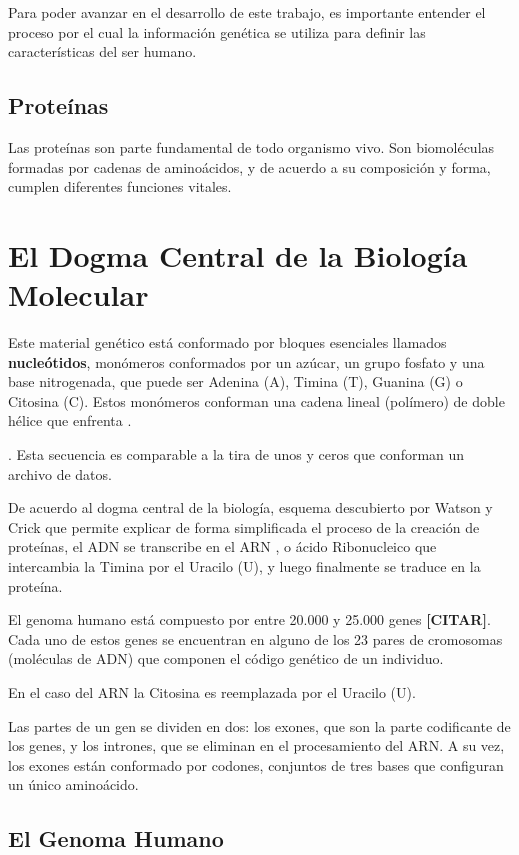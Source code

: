 Para poder avanzar en el desarrollo de este trabajo, es importante entender el proceso por el cual la información genética se utiliza para definir las características del ser humano. 


\subsection{Proteínas}

Las proteínas son parte fundamental de todo organismo vivo. Son biomoléculas formadas por cadenas de aminoácidos, y de acuerdo a su composición y forma, cumplen diferentes funciones vitales.


\section{El Dogma Central de la Biología Molecular}

Este material genético está conformado por bloques esenciales llamados \textbf{nucleótidos}, monómeros conformados por un azúcar, un grupo fosfato y una base nitrogenada, que puede ser Adenina (A), Timina (T), Guanina (G) o Citosina (C). Estos monómeros conforman una cadena lineal (polímero) de doble hélice que enfrenta .



\cite{Alberts2014}. Esta secuencia es comparable a la tira de unos y ceros que conforman un archivo de datos. 

De acuerdo al dogma central de la biología, esquema descubierto por Watson y Crick que permite explicar de forma simplificada el proceso de la creación de proteínas, el ADN se transcribe en el ARN , o ácido Ribonucleico que intercambia la Timina por el Uracilo (U), y luego finalmente se traduce en la proteína.

El genoma humano está compuesto por entre 20.000 y 25.000 genes \textbf{[CITAR]}. Cada uno de estos genes se encuentran en alguno de los 23 pares de cromosomas (moléculas de ADN) que componen el código genético de un individuo. 

En el caso del ARN la Citosina es reemplazada por el Uracilo (U).

Las partes de un gen se dividen en dos: los exones, que son la parte codificante de los genes, y los intrones, que se eliminan en el procesamiento del ARN. 
A su vez, los exones están conformado por codones, conjuntos de tres bases que configuran un único aminoácido. 


\subsection{El Genoma Humano}

